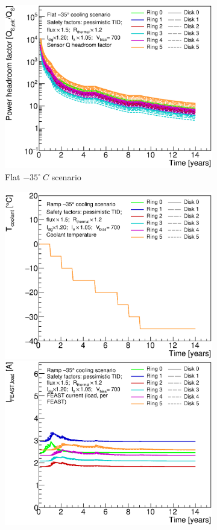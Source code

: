 \begin{figure}[ht!]
\begin{subfigure}[t]{0.50\textwidth}
\begin{center}
\includegraphics[width=0.74\linewidth]{figures/studies/Endcap_SensorQHeadroom_WorstCase.eps}
\end{center}
\caption{Flat $-35^{\circ}~C$ scenario}
\end{subfigure}
\begin{subfigure}[t]{0.50\textwidth}
\begin{center}
\includegraphics[width=0.74\linewidth]{figures/studies/Endcap_CoolantTemperature_Ramp_m35.eps}
\includegraphics[width=0.74\linewidth]{figures/studies/Endcap_FeastCurrent_Ramp_m35.eps}

\end{center}
\end{subfigure}
\end{figure}
